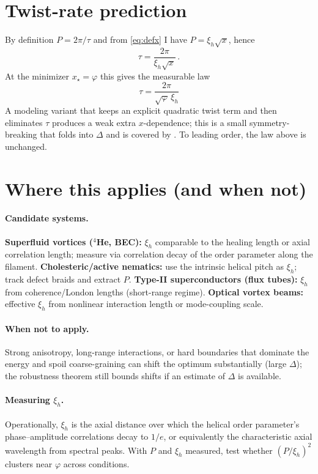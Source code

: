 \documentclass[11pt]{article}
\theoremstyle{remark}
\theoremstyle{definition}
\newcommand{\ph}{\varphi}
\begin{document}
\section{Twist-rate prediction}
By definition $P=2\pi/\tau$ and from \eqref{eq:defx} I have $P=\xi_h\sqrt{x}$, hence
\begin{equation}
 \tau=\frac{2\pi}{\xi_h\sqrt{x}}\,.
\end{equation}
At the minimizer $x_\star=\ph$ this gives the measurable law
\begin{equation}
 \boxed{\;\tau=\dfrac{2\pi}{\sqrt{\ph}\,\xi_h}\;}
\end{equation}
A modeling variant that keeps an explicit quadratic twist term and then eliminates $\tau$ produces a weak extra $x$-dependence; this is a small symmetry-breaking that folds into $\Delta$ and is covered by . To leading order, the law above is unchanged.

\section{Where this applies (and when not)}
\paragraph{Candidate systems.} \textbf{Superfluid vortices (\(^{4}\)He, BEC):} $\xi_h$ comparable to the healing length or axial correlation length; measure via correlation decay of the order parameter along the filament. \textbf{Cholesteric/active nematics:} use the intrinsic helical pitch as $\xi_h$; track defect braids and extract $P$. \textbf{Type-II superconductors (flux tubes):} $\xi_h$ from coherence/London lengths (short-range regime). \textbf{Optical vortex beams:} effective $\xi_h$ from nonlinear interaction length or mode-coupling scale.
\paragraph{When not to apply.} Strong anisotropy, long-range interactions, or hard boundaries that dominate the energy and spoil coarse-graining can shift the optimum substantially (large $\Delta$); the robustness theorem still bounds shifts if an estimate of $\Delta$ is available.
\paragraph{Measuring $\xi_h$.} Operationally, $\xi_h$ is the axial distance over which the helical order parameter's phase--amplitude correlations decay to $1/e$, or equivalently the characteristic axial wavelength from spectral peaks. With $P$ and $\xi_h$ measured, test whether $(P/\xi_h)^2$ clusters near $\ph$ across conditions.
\end{document}
